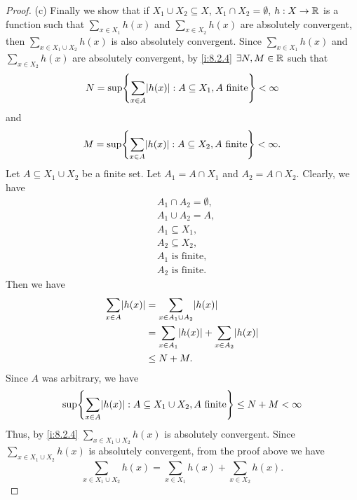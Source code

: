 \begin{proof}{(c)}
  Finally we show that if \(X_1 \cup X_2 \subseteq X\), \(X_1 \cap X_2 = \emptyset\), \(h : X \to \mathbb{R}\) is a function such that \(\sum_{x \in X_1} h(x)\) and \(\sum_{x \in X_2} h(x)\) are absolutely convergent, then \(\sum_{x \in X_1 \cup X_2} h(x)\) is also absolutely convergent.
  Since \(\sum_{x \in X_1} h(x)\) and \(\sum_{x \in X_2} h(x)\) are absolutely convergent, by \cref{i:8.2.4} \(\exists N, M \in \mathbb{R}\) such that
  \[
    N = \sup\set{\sum_{x \in A} \abs{h(x)} : A \subseteq X_1, A \text{ finite}} < \infty
  \]
  and
  \[
    M = \sup\set{\sum_{x \in A} \abs{h(x)} : A \subseteq X_2, A \text{ finite}} < \infty.
  \]
  Let \(A \subseteq X_1 \cup X_2\) be a finite set.
  Let \(A_1 = A \cap X_1\) and \(A_2 = A \cap X_2\).
  Clearly, we have
  \begin{align*}
     & A_1 \cap A_2 = \emptyset, \\
     & A_1 \cup A_2 = A,         \\
     & A_1 \subseteq X_1,        \\
     & A_2 \subseteq X_2,        \\
     & A_1 \text{ is finite},    \\
     & A_2 \text{ is finite}.
  \end{align*}
  Then we have
  \begin{align*}
    \sum_{x \in A} \abs{h(x)} & = \sum_{x \in A_1 \cup A_2} \abs{h(x)}                      \\
                              & = \sum_{x \in A_1} \abs{h(x)} + \sum_{x \in A_2} \abs{h(x)} \\
                              & \leq N + M.
  \end{align*}
  Since \(A\) was arbitrary, we have
  \[
    \sup\set{\sum_{x \in A} \abs{h(x)} : A \subseteq X_1 \cup X_2, A \text{ finite}} \leq N + M < \infty
  \]
  Thus, by \cref{i:8.2.4} \(\sum_{x \in X_1 \cup X_2} h(x)\) is absolutely convergent.
  Since \(\sum_{x \in X_1 \cup X_2} h(x)\) is absolutely convergent, from the proof above we have
  \[
    \sum_{x \in X_1 \cup X_2} h(x) = \sum_{x \in X_1} h(x) + \sum_{x \in X_2} h(x).
  \]
\end{proof}

